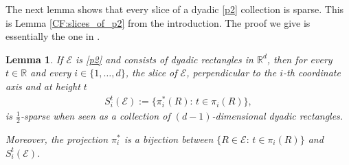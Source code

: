 \documentclass[oneside]{amsart}
\newtheorem{lemma}[theorem]{Lemma}
\theoremstyle{definition}
\theoremstyle{plain}
\numberwithin{equation}{section}
\numberwithin{theorem}{section}
\begin{document}
The next lemma shows that every slice of a dyadic \eqref{p2} collection is
sparse.
This is Lemma \ref{CF:slices_of_p2} from the introduction.
The proof we give is essentially the one in \cite{CordobaFefferman1975}.
\begin{lemma}
  \label{zygmund:slices_of_p2}
  If $\mathcal{E}$ is \eqref{p2} and consists of dyadic rectangles in
  $\mathbb{R}^d$, then for every $t \in \mathbb{R}$ and every
  $i \in \{1, \dots, d\}$,
  the slice of $\mathcal{E}$, perpendicular to the $i$-th coordinate axis and at
  height $t$
  \begin{align*}
    S_i^t(\mathcal{E}) := \{\pi_i^*(R):\, t \in \pi_i(R)\},
  \end{align*}
  is $\frac{1}{2}$-sparse when seen as a collection of $(d-1)$-dimensional
  dyadic rectangles.

  Moreover, the projection $\pi_i^*$ is a bijection between
  $\{R \in \mathcal{E}:\, t \in \pi_i(R)\}$ and $S_i^t(\mathcal{E})$.
\end{lemma}
\end{document}
